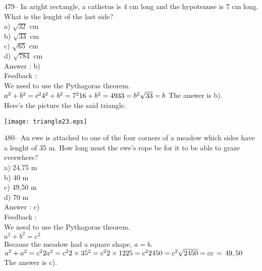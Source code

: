 ﻿\documentclass[letterpaper, 12pt]{article}
\begin{document}
479-- In aright rectangle, a cathetus is 4 cm long and
the hypotenuse is 7 cm long. What is the lenght of the last side?\\
a) $\sqrt{32}$ cm\\
b) $\sqrt{33}$ cm\\
c) $\sqrt{65}$ cm\\
d) $\sqrt{784}$ cm\\

Answer :  b)\\

Feedback : \\
We need to use the Pythagoras theorem.  \\
$a^{2}+b^{2}=c^{2}\\
4^{2}+b^{2}=7^{2}\\
16+b^{2}=49\\
33=b^{2}\\
\sqrt{33}=b\\$
The answer is b).\\
Here's the picture the the said triangle.\\
    \begin{center}
    \texttt{[image: triangle23.eps]}
    \end{center}


480--  An ewe is attached to one of the four corners of a meadow which sides have a lenght of 35 m. How long must the ewe's rope be for it to be able to graze everwhere?\\
a) 24,75 m\\
b) 40 m\\
c) 49,50 m\\
d) 70 m\\

Answer :  c)\\

Feedback : \\
We need to use the Pythagoras theorem.  \\
$a^{2}+b^{2}=c^{2}$\\
Because the meadow had a square shape, $a=b.$\\
$a^{2}+a^{2}=c^{2}\\
2a^{2}=c^{2}\\
2\times35^{2}=c^{2}\\
2\times 1225=c^{2}\\
2450=c^{2}\\
\sqrt{2450}=c\\
c\,=\,49,50$\\
The answer is c).\\
\end{document}
